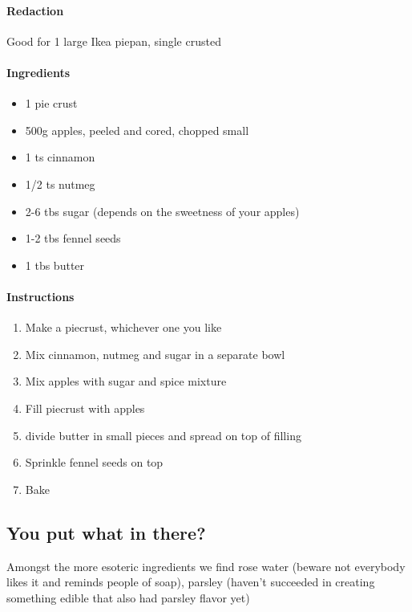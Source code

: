 \documentclass[a4paper]{article}
\begin{document}
\paragraph{Redaction}
Good for 1 large Ikea piepan, single crusted

\paragraph{Ingredients}
\begin{itemize}
\item 1 pie crust
\item 500g apples, peeled and cored, chopped small
\item 1 ts cinnamon
\item 1/2 ts nutmeg
\item 2-6 tbs sugar (depends on the sweetness of your apples)
\item 1-2 tbs fennel seeds
\item 1 tbs butter
\end{itemize}

\paragraph{Instructions}
\begin{enumerate}
\item Make a piecrust, whichever one you like
\item Mix cinnamon, nutmeg and sugar in a separate bowl
\item Mix apples with sugar and spice mixture
\item Fill piecrust with apples
\item divide butter in small pieces and spread on top of filling
\item Sprinkle fennel seeds on top
\item Bake
\end{enumerate}







\subsection{You put what in there?}
Amongst the more esoteric ingredients we find rose water (beware not everybody likes it and reminds people of soap), parsley (haven’t succeeded in creating something edible that also had parsley flavor yet)
\end{document}
